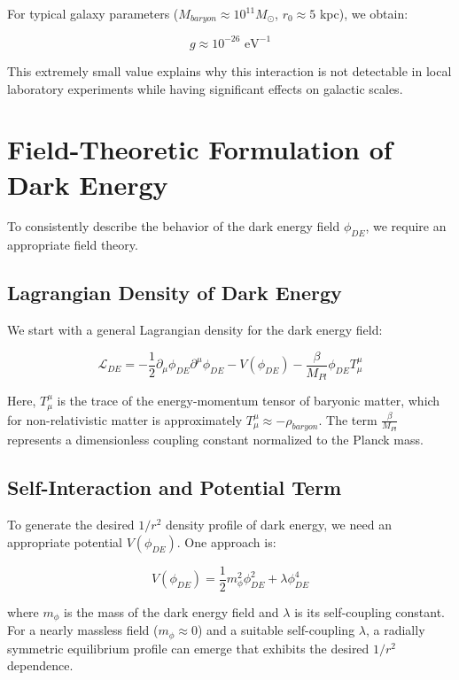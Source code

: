\documentclass[a4paper,12pt]{article}
\begin{document}
	For typical galaxy parameters ($M_{baryon} \approx 10^{11} M_{\odot}$, $r_0 \approx 5$ kpc), we obtain:
	
	\begin{equation}
		g \approx 10^{-26} \text{ eV}^{-1}
	\end{equation}
	
	This extremely small value explains why this interaction is not detectable in local laboratory experiments while having significant effects on galactic scales.
	
	\section{Field-Theoretic Formulation of Dark Energy}
	
	To consistently describe the behavior of the dark energy field $\phi_{DE}$, we require an appropriate field theory.
	
	\subsection{Lagrangian Density of Dark Energy}
	
	We start with a general Lagrangian density for the dark energy field:
	
	\begin{equation}
		\mathcal{L}_{DE} = -\frac{1}{2}\partial_\mu \phi_{DE} \partial^\mu \phi_{DE} - V(\phi_{DE}) - \frac{\beta}{M_{Pl}} \phi_{DE} T^{\mu}_{\mu}
	\end{equation}
	
	Here, $T^{\mu}_{\mu}$ is the trace of the energy-momentum tensor of baryonic matter, which for non-relativistic matter is approximately $T^{\mu}_{\mu} \approx -\rho_{baryon}$. The term $\frac{\beta}{M_{Pl}}$ represents a dimensionless coupling constant normalized to the Planck mass.
	
	\subsection{Self-Interaction and Potential Term}
	
	To generate the desired $1/r^2$ density profile of dark energy, we need an appropriate potential $V(\phi_{DE})$. One approach is:
	
	\begin{equation}
		V(\phi_{DE}) = \frac{1}{2}m_{\phi}^2\phi_{DE}^2 + \lambda \phi_{DE}^4
	\end{equation}
	
	where $m_{\phi}$ is the mass of the dark energy field and $\lambda$ is its self-coupling constant. For a nearly massless field ($m_{\phi} \approx 0$) and a suitable self-coupling $\lambda$, a radially symmetric equilibrium profile can emerge that exhibits the desired $1/r^2$ dependence.
	
\end{document}
